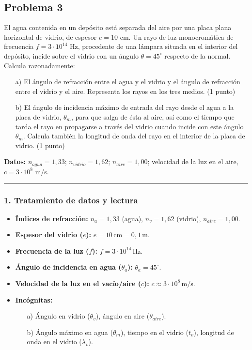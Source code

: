 \newpage
\subsection{Problema 3}
\label{subsec:P3_2024_jul_ext}

\begin{cajaenunciado}
El agua contenida en un depósito está separada del aire por una placa plana horizontal de vidrio, de espesor $e=10$ cm. Un rayo de luz monocromática de frecuencia $f=3\cdot10^{14}$ Hz, procedente de una lámpara situada en el interior del depósito, incide sobre el vidrio con un ángulo $\theta=45^{\circ}$ respecto de la normal. Calcula razonadamente:
\begin{enumerate}
    \item[a)] El ángulo de refracción entre el agua y el vidrio y el ángulo de refracción entre el vidrio y el aire. Representa los rayos en los tres medios. (1 punto)
    \item[b)] El ángulo de incidencia máximo de entrada del rayo desde el agua a la placa de vidrio, $\theta_{m}$, para que salga de ésta al aire, así como el tiempo que tarda el rayo en propagarse a través del vidrio cuando incide con este ángulo $\theta_{m}$. Calcula también la longitud de onda del rayo en el interior de la placa de vidrio. (1 punto)
\end{enumerate}
\textbf{Datos:} $n_{agua}=1,33$; $n_{vidrio}=1,62$; $n_{aire}=1,00$; velocidad de la luz en el aire, $c=3\cdot10^{8}$ m/s.
\end{cajaenunciado}
\hrule

\subsubsection*{1. Tratamiento de datos y lectura}
\begin{itemize}
    \item \textbf{Índices de refracción:} $n_a = 1,33$ (agua), $n_v = 1,62$ (vidrio), $n_{aire} = 1,00$.
    \item \textbf{Espesor del vidrio ($e$):} $e = 10 \, \text{cm} = 0,1 \, \text{m}$.
    \item \textbf{Frecuencia de la luz ($f$):} $f = 3 \cdot 10^{14} \, \text{Hz}$.
    \item \textbf{Ángulo de incidencia en agua ($\theta_a$):} $\theta_a = 45^\circ$.
    \item \textbf{Velocidad de la luz en el vacío/aire ($c$):} $c \approx 3 \cdot 10^8 \, \text{m/s}$.
    \item \textbf{Incógnitas:}
    \begin{itemize}
        \item [a)] Ángulo en vidrio ($\theta_v$), ángulo en aire ($\theta_{aire}$).
        \item [b)] Ángulo máximo en agua ($\theta_m$), tiempo en el vidrio ($t_v$), longitud de onda en el vidrio ($\lambda_v$).
    \end{itemize}
\end{itemize}

